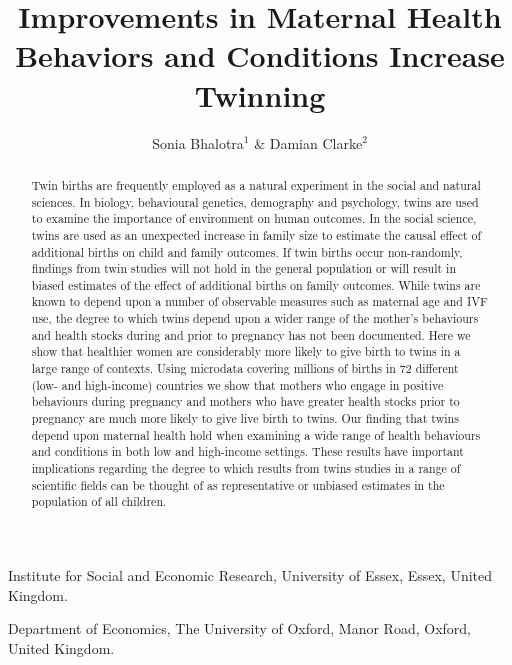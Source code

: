 \documentclass{nature}
\title{Improvements in Maternal Health Behaviors and Conditions Increase Twinning}
\author{Sonia Bhalotra$^{1}$ \& Damian Clarke$^2$}
\begin{document}
\maketitle

\begin{affiliations}
 \item Institute for Social and Economic Research, University of Essex, Essex, United Kingdom.
 \item Department of Economics, The University of Oxford, Manor Road, Oxford, United Kingdom.
\end{affiliations}

\begin{linenumbers}
\begin{abstract}
Twin births are frequently employed as a natural experiment in the social and natural sciences\cite{Boomsmaetal2002,Poldermanetal2015}.  In biology, behavioural genetics, demography and psychology, twins are used to examine the importance of environment on human outcomes\cite{Boomsmaetal2002,Poldermanetal2015,Phillips1993,BouchardPropping1993,McClearnetal1997,Nisen2013}. In the social science, twins are used as an unexpected increase in family size to estimate the causal effect of additional births on child and family outcomes\cite{WolpinRosenzweig2000,RosenzweigWolpin1980,AngristEvans1988}.  If twin births occur non-randomly, findings from twin studies will not hold in the general population or will result in biased estimates of the effect of additional births on family outcomes.  While twins are known to depend upon a number of observable measures such as maternal age and IVF use\cite{Hall2003,Hoekstraetal2008,Vitthalaetal2009}, the degree to which twins depend upon a wider range of the mother's behaviours and health stocks during and prior to pregnancy has not been documented.  Here we show that healthier women are considerably more likely to give birth to twins in a large range of contexts.  Using microdata covering millions of births in 72 different (low- and high-income) countries we show that mothers who engage in positive behaviours during pregnancy and mothers who have greater health stocks prior to pregnancy are much more likely to give live birth to twins.  Our finding that twins depend upon maternal health hold when examining a wide range of health behaviours and conditions in both low and high-income settings.  These results have important implications regarding the degree to which results from twins studies in a range of scientific fields can be thought of as representative or unbiased estimates in the population of all children.
\end{abstract}


\end{linenumbers}
\end{document}

